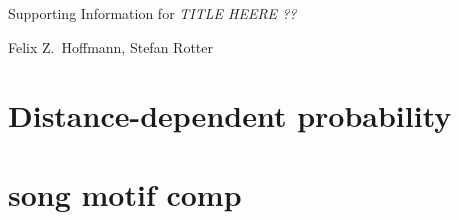 \documentclass[11pt, paper=a4]{article}
\begin{document}
\begin{center}
  \Large
  Supporting Information for \textit{TITLE HEERE ??}
  \smallskip
  \normalsize
  
  Felix Z.~Hoffmann, Stefan Rotter
\end{center}


\section{Distance-dependent probability}



\section{song motif comp}

\end{document}
